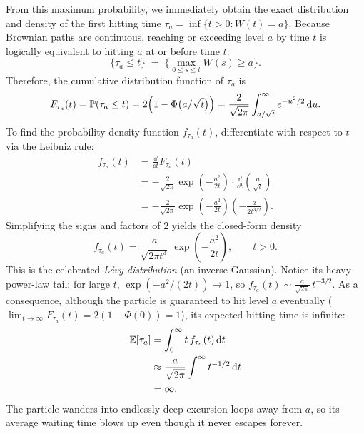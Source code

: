 From this maximum probability, we immediately obtain the exact distribution and density of the first hitting time $\tau_a = \inf\{t > 0 : W(t) = a\}$. Because Brownian paths are continuous, reaching or exceeding level $a$ by time $t$ is logically equivalent to hitting $a$ at or before time $t$:
\[
  \{\tau_a \le t\} \;=\; \Big\{\max_{0\le s\le t} W(s) \ge a\Big\}.
\]
Therefore, the cumulative distribution function of $\tau_a$ is
\[
  F_{\tau_a}(t) = \operatorname{\mathbb{P}}(\tau_a \le t) = 2\Big(1 - \Phi\big(a/\sqrt{t}\big)\Big) = \frac{2}{\sqrt{2\pi}} \int_{a/\sqrt{t}}^\infty e^{-u^2/2}\,\mathrm{d} u.
\]
To find the probability density function $f_{\tau_a}(t)$, differentiate with respect to $t$ via the Leibniz rule:
\begin{align*}
  f_{\tau_a}(t) &= \frac{\dd}{\dd t} F_{\tau_a}(t) \\
  &= -\frac{2}{\sqrt{2\pi}} \exp\!\left(-\frac{a^2}{2t}\right) \cdot \frac{\dd}{\dd t}\left(\frac{a}{\sqrt{t}}\right) \\
  &= -\frac{2}{\sqrt{2\pi}} \exp\!\left(-\frac{a^2}{2t}\right) \left(-\frac{a}{2 t^{3/2}}\right).
\end{align*}
Simplifying the signs and factors of $2$ yields the closed-form density
\[
  \boxed{\;f_{\tau_a}(t) = \frac{a}{\sqrt{2\pi t^3}}\,\exp\!\left(-\frac{a^2}{2t}\right), \qquad t > 0.\;}
\]
This is the celebrated \emph{L\'evy distribution} (an inverse Gaussian). Notice its heavy power-law tail: for large $t$, $\exp(-a^2/(2t)) \to 1$, so $f_{\tau_a}(t) \sim \frac{a}{\sqrt{2\pi}}\,t^{-3/2}$. As a consequence, although the particle is guaranteed to hit level $a$ eventually ($\lim_{t\to\infty} F_{\tau_a}(t) = 2(1 - \Phi(0)) = 1$), its expected hitting time is infinite:
\begin{align*}
  \operatorname{\mathbb{E}}[\tau_a] &= \int_0^\infty t\,f_{\tau_a}(t)\,\mathrm{d} t \\
  &\approx \frac{a}{\sqrt{2\pi}} \int^\infty t^{-1/2}\,\mathrm{d} t \\
  &= \infty.
\end{align*}
The particle wanders into endlessly deep excursion loops away from $a$, so its average waiting time blows up even though it never escapes forever.

